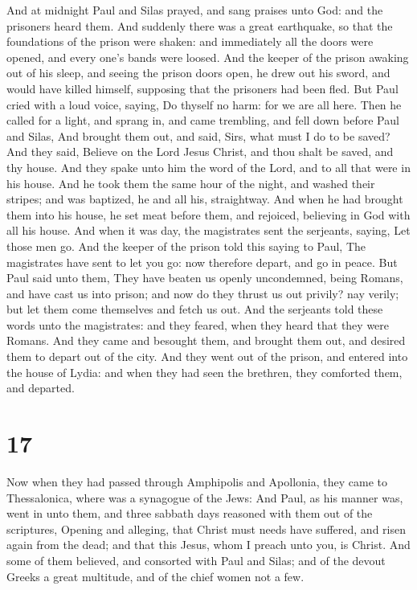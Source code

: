  And at midnight Paul and Silas prayed, and sang praises
unto God: and the prisoners heard them.  And suddenly there
was a great earthquake, so that the foundations of the prison were
shaken: and immediately all the doors were opened, and every one's bands
were loosed.  And the keeper of the prison awaking out of
his sleep, and seeing the prison doors open, he drew out his sword, and
would have killed himself, supposing that the prisoners had been fled.
 But Paul cried with a loud voice, saying, Do thyself no
harm: for we are all here.  Then he called for a light, and
sprang in, and came trembling, and fell down before Paul and Silas,
 And brought them out, and said, Sirs, what must I do to be
saved?  And they said, Believe on the Lord Jesus Christ,
and thou shalt be saved, and thy house.  And they spake
unto him the word of the Lord, and to all that were in his house.
 And he took them the same hour of the night, and washed
their stripes; and was baptized, he and all his, straightway.
 And when he had brought them into his house, he set meat
before them, and rejoiced, believing in God with all his house.
 And when it was day, the magistrates sent the serjeants,
saying, Let those men go.  And the keeper of the prison
told this saying to Paul, The magistrates have sent to let you go: now
therefore depart, and go in peace.  But Paul said unto
them, They have beaten us openly uncondemned, being Romans, and have
cast us into prison; and now do they thrust us out privily? nay verily;
but let them come themselves and fetch us out.  And the
serjeants told these words unto the magistrates: and they feared, when
they heard that they were Romans.  And they came and
besought them, and brought them out, and desired them to depart out of
the city.  And they went out of the prison, and entered
into the house of Lydia: and when they had seen the brethren, they
comforted them, and departed.

\hypertarget{section-16}{%
\section{17}\label{section-16}}

 Now when they had passed through Amphipolis and Apollonia,
they came to Thessalonica, where was a synagogue of the Jews:
 And Paul, as his manner was, went in unto them, and three
sabbath days reasoned with them out of the scriptures, 
Opening and alleging, that Christ must needs have suffered, and risen
again from the dead; and that this Jesus, whom I preach unto you, is
Christ.  And some of them believed, and consorted with Paul
and Silas; and of the devout Greeks a great multitude, and of the chief
women not a few.

